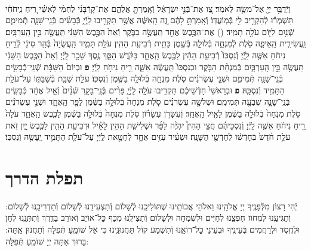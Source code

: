\documentclass[twoside, openany, parskip=half, 11pt]{book}
\begin{document}
\begin{footnotesize}
\begin{multicols}{2}
\\
וַיְֿדַבֵּ֥ר יְיָ֖ אֶל־משֶׂ֥ה לֵּאמֹֽר׃ צַ֚ו אֶת־בְּֿנֵ֣י יִשְׂרָאֵ֔ל וְֿאָֽמַרְתָּ֖ אֲלֵהֶ֑ם אֶת־קָרְֿבָּנִ֨י לַחְמִ֜י לְֿאִשַּׁ֗י רֵ֚יחַ נִֽיחֹחִ֔י תִּשְׁמְר֕וּ לְֿהַקְרִ֥יב לִ֖י בְּֿמֽוֹעֲדֽוֹ׃
וְֿאָֽמַרְתָּ֣ לָהֶ֔ם זֶ֚ה הָֽאִשֶּׁ֔ה אֲשֶׁ֥ר תַּקְרִ֖יבוּ לַֽיְֿיָ֑ כְּֿבָשִׂ֨ים בְּֿנֵֽי־שָׁנָ֧ה תְֿמִימִ֛ם שְֿׁנַ֥יִם לַיּ֖וֹם עֹלָ֥ה תָמִֽיד׃
()
אֶת־הַכֶּ֥בֶשׂ אֶחָ֖ד תַּֽעֲשֶׂ֣ה בַבֹּ֑קֶר וְֿאֵת֙ הַכֶּ֣בֶשׂ הַשֵּׁנִ֔י תַּֽעֲשֶׂ֖ה בֵּ֥ין הָֽעַרְבָּֽיִם׃ וַֽעֲשִׂירִ֧ית הָֽאֵיפָ֛ה סֹ֖לֶת לְֿמִנְחָ֑ה בְּֿלוּלָ֛ה בְּֿשֶׁ֥מֶן כָּתִ֖ית רְֿבִיעִ֥ת הַהִֽין׃
עֹלַ֖ת תָּמִ֑יד הָֽעֲשֻׂיָה֙ בְּֿהַ֣ר סִינַ֔י לְֿרֵ֣יחַ נִיחֹ֔חַ אִשֶּׁ֖ה לַֽיְֿיָ׃ וְֿנִסְכּוֹ֙ רְֿבִיעִ֥ת הַהִ֔ין לַכֶּ֖בֶשׂ הָֽאֶחָ֑ד בַּקֹּ֗דֶשׁ הַסֵּ֛ךְ נֶ֥סֶךְ שֵׁכָ֖ר לַֽיְֿיָ׃ וְֿאֵת֙ הַכֶּ֣בֶשׂ הַשֵּׁנִ֔י תַּֽעֲשֶׂ֖ה בֵּ֣ין הָֽעַרְבָּ֑יִם כְּֿמִנְחַ֨ת הַבֹּ֤קֶר וּכְנִסְכּוֹ֙ תַּֽעֲשֶׂ֔ה אִשֵּׁ֛ה רֵ֥יחַ נִיחֹ֖חַ לַֽיְֿיָ׃ \textbf{פ}
וּבְיוֹם֙ הַשַּׁבָּ֔ת שְֿׁנֵֽי־כְֿבָשִׂ֥ים בְּֿנֵֽי־שָׁנָ֖ה תְּֿמִימִ֑ם וּשְׁנֵ֣י עֶשְׂרֹנִ֗ים סֹ֧לֶת מִנְחָ֛ה בְּֿלוּלָ֥ה בַשֶּׁ֖מֶן וְֿנִסְכּֽוֹ׃ עֹלַ֥ת שַׁבַּ֖ת בְּֿשַׁבַּתּ֑וֹ עַל־עֹלַ֥ת הַתָּמִ֖יד וְֿנִסְכָּֽהּ׃ \textbf{פ}
וּבְרָאשֵׁי֙ חָדְֿשֵׁיכֶ֔ם תַּקְרִ֥יבוּ עֹלָ֥ה לַֽיְֿיָ֑ פָּרִ֨ים בְּֿנֵֽי־בָקָ֤ר שְֿׁנַ֨יִם֙ וְֿאַ֣יִל אֶחָ֔ד כְּֿבָשִׂ֧ים בְּֿנֵֽי־שָׁנָ֛ה שִׁבְעָ֖ה תְּֿמִימִֽם׃ וּשְׁלֹשָׁ֣ה עֶשְׂרֹנִ֗ים סֹ֤לֶת מִנְחָה֙ בְּֿלוּלָ֣ה בַשֶּׁ֔מֶן לַפָּ֖ר הָֽאֶחָ֑ד וּשְׁנֵ֣י עֶשְׂרֹנִ֗ים סֹ֤לֶת מִנְחָה֙ בְּֿלוּלָ֣ה בַשֶּׁ֔מֶן לָאַ֖יִל הָֽאֶחָֽד׃ וְֿעִשָּׂרֹ֣ן עִשָּׂר֗וֹן סֹ֤לֶת מִנְחָה֙ בְּֿלוּלָ֣ה בַשֶּׁ֔מֶן לַכֶּ֖בֶשׂ הָֽאֶחָ֑ד עֹלָה֙ רֵ֣יחַ נִיחֹ֔חַ אִשֶּׁ֖ה לַֽיְֿיָ׃ וְֿנִסְכֵּיהֶ֗ם חֲצִ֣י הַהִין֩ יִהְיֶ֨ה לַפָּ֜ר וּשְׁלִישִׁ֧ת הַהִ֣ין לָאַ֗יִל וּרְבִיעִ֥ת הַהִ֛ין לַכֶּ֖בֶשׂ יָ֑יִן זֹ֣את עֹלַ֥ת חֹ֨דֶשׁ֙ בְּֿחָדְֿשׁ֔וֹ לְֿחָדְֿשֵׁ֖י הַשָּׁנָֽה׃ וּשְׂעִ֨יר עִזִּ֥ים אֶחָ֛ד לְֿחַטָּ֖את לַֽיְֿיָ עַל־עֹלַ֧ת הַתָּמִ֛יד יֵֽעָשֶׂ֖ה וְֿנִסְכּֽוֹ׃

\end{multicols}

\end{footnotesize}

\chapter{תפלת הדרך}

יְֿהִי רָצוֹן מִלְּֿפָנֶֽיךָ יְיָ אֱלֹהֵֽינוּ וֵאלֹהֵי אֲבוֹתֵֽינוּ שֶׁתּוֹלִיכֵֽנוּ לְֿשָׁלוֹם וְֿתַצְעִידֵֽנוּ לְֿשָׁלוֹם וְֿתַדְרִיכֵֽנוּ לְֿשָׁלוֹם: וְֿתַגִּיעֵֽנוּ לִמְחוֹז חֶפְצֵֽנוּ לְֿחַיִּים וּלְשִׂמְחָה וּלְשָׁלוֹם וְֿתַצִּילֵֽנוּ מִכַּף כׇּל־אוֹיֵב וְֿאוֹרֵב בַּדֶּֽרֶךְ וְֿתִתְּֿנֵֽנוּ לְֿחֵן וּלְחֶֽסֶד וּלְרַחֲמִים בְּֿעֵינֶֽיךָ וּבְעֵינֵי כׇל־רוֹאֵֽנוּ וְֿתִשְׁמַע קוֹל תַּחֲנוּנֵֽינוּ כִּי אֵל שׁוֹמֵֽעַ תְּֿפִלָה וְֿתַחֲנוּן אַֽתָּה: בָּרוּךְ אַתָּה יְיָ שׁוֹמֵֽעַ תְּֿפִלָּה:\\

\clearpage

\blankpage
\end{document}
